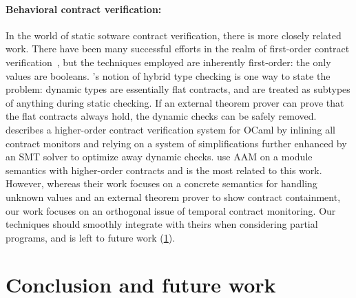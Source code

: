 \paragraph{Behavioral contract verification:}
In the world of static sotware contract verification, there is more closely related work.
%
There have been many successful efforts in the realm of first-order contract verification~\citep{ianjohnson:fahndrich:contracts:2011,ianjohnson:vcc:2009}, but the techniques employed are inherently first-order: the only values are booleans.
%
\citet{ianjohnson:Flanagan:2006:HTC:1111037.1111059}'s notion of hybrid type checking is one way to state the problem: dynamic types are essentially flat contracts, and are treated as subtypes of anything during static checking.
%
If an external theorem prover can prove that the flat contracts always hold, the dynamic checks can be safely removed.
%
\citet{dvanhorn:Xu2012Hybrid} describes a higher-order contract verification system for OCaml by inlining all contract monitors and relying on a system of simplifications further enhanced by an SMT solver to optimize away dynamic checks.
%
\citet{dvanhorn:TobinHochstadt2012Higherorder} use AAM on a module semantics with higher-order contracts and is the most related to this work.
%
However, whereas their work focuses on a concrete semantics for handling unknown values and an external theorem prover to show contract containment, our work focuses on an orthogonal issue of temporal contract monitoring.
%
Our techniques should smoothly integrate with theirs when considering partial programs, and is left to future work (\cref{sec:conclusion}).

\section{Conclusion and future work} \label{sec:conclusion}

